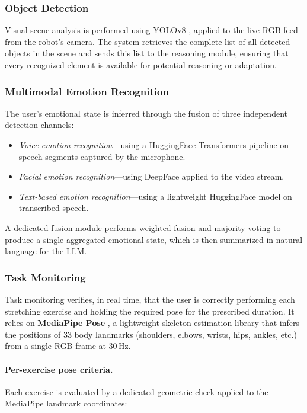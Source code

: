 \subsubsection{Object Detection}
Visual scene analysis is performed using YOLOv8 \cite{ref18}, applied to the live RGB feed from the robot's camera. The system retrieves the complete list of all detected objects in the scene and sends this list to the reasoning module, ensuring that every recognized element is available for potential reasoning or adaptation.

\subsubsection{Multimodal Emotion Recognition}
The user's emotional state is inferred through the fusion of three independent detection channels:
\begin{itemize}
\item \textit{Voice emotion recognition}—using a HuggingFace Transformers pipeline \cite{ref19} on speech segments captured by the microphone.
\item \textit{Facial emotion recognition}—using DeepFace \cite{ref20} applied to the video stream.
\item \textit{Text-based emotion recognition}—using a lightweight HuggingFace model \cite{ref19} on transcribed speech.
\end{itemize}

A dedicated fusion module performs weighted fusion and majority voting to produce a single aggregated emotional state, which is then summarized in natural language for the LLM.

\subsubsection{Task Monitoring}
Task monitoring verifies, in real time, that the user is correctly performing each stretching exercise and holding the required pose for the prescribed duration. It relies on \textbf{MediaPipe Pose} \cite{ref21}, a lightweight skeleton-estimation library that infers the positions of 33 body landmarks (shoulders, elbows, wrists, hips, ankles, etc.) from a single RGB frame at 30\,Hz.

\paragraph{Per-exercise pose criteria.}
Each exercise is evaluated by a dedicated geometric check applied to the MediaPipe landmark coordinates:

